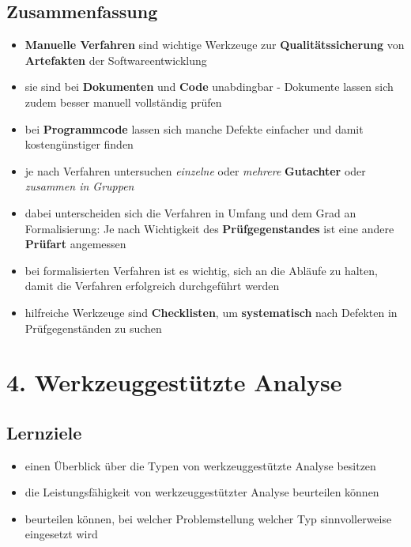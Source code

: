 \subsection*{Zusammenfassung}
\begin{itemize}
    \item \textbf{Manuelle Verfahren} sind wichtige Werkzeuge zur \textbf{Qualitätssicherung} von \textbf{Artefakten} der Softwareentwicklung
    \item sie sind bei \textbf{Dokumenten} und \textbf{Code} unabdingbar - Dokumente lassen sich zudem besser manuell vollständig prüfen
    \item bei \textbf{Programmcode} lassen sich manche Defekte einfacher und damit kostengünstiger finden
    \item je nach Verfahren untersuchen \textit{einzelne} oder \textit{mehrere} \textbf{Gutachter} oder \textit{zusammen in Gruppen}
    \item dabei unterscheiden sich die Verfahren in Umfang und dem Grad an Formalisierung: Je nach Wichtigkeit des \textbf{Prüfgegenstandes} ist eine andere \textbf{Prüfart} angemessen
    \item bei formalisierten Verfahren ist es wichtig, sich an die Abläufe zu halten, damit die Verfahren erfolgreich durchgeführt werden
    \item hilfreiche Werkzeuge sind \textbf{Checklisten}, um \textbf{systematisch} nach Defekten in Prüfgegenständen
    zu suchen
\end{itemize}

\section*{4. Werkzeuggestützte Analyse}
\subsection*{Lernziele}
\begin{itemize}
    \item einen Überblick über die Typen von werkzeuggestützte Analyse besitzen
    \item die Leistungsfähigkeit von werkzeuggestützter Analyse beurteilen können
    \item beurteilen können, bei welcher Problemstellung welcher Typ sinnvollerweise eingesetzt wird
\end{itemize}

